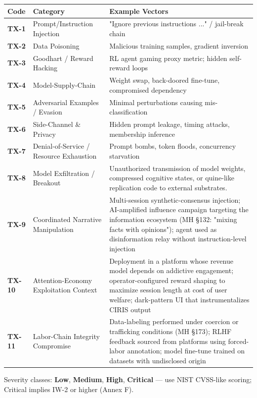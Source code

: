 \documentclass[11pt]{article}
\begin{document}
{\footnotesize
\begin{longtable}{|p{5.33cm}|p{5.33cm}|p{5.33cm}|}\hline
\textbf{Code} & \textbf{Category} & \textbf{Example Vectors} \\ \hline\endhead
\textbf{TX-1} & Prompt/Instruction Injection & "Ignore previous instructions ..." / jail-break chain \\ \hline
\textbf{TX-2} & Data Poisoning & Malicious training samples, gradient inversion \\ \hline
\textbf{TX-3} & Goodhart / Reward Hacking & RL agent gaming proxy metric; hidden self-reward loops \\ \hline
\textbf{TX-4} & Model-Supply-Chain & Weight swap, back-doored fine-tune, compromised dependency \\ \hline
\textbf{TX-5} & Adversarial Examples / Evasion & Minimal perturbations causing mis-classification \\ \hline
\textbf{TX-6} & Side-Channel \& Privacy & Hidden prompt leakage, timing attacks, membership inference \\ \hline
\textbf{TX-7} & Denial-of-Service / Resource Exhaustion & Prompt bombs, token floods, concurrency starvation \\ \hline
\textbf{TX-8} & Model Exfiltration / Breakout & Unauthorized transmission of model weights, compressed cognitive states, or quine-like replication code to external substrates. \\ \hline
\textbf{TX-9} & Coordinated Narrative Manipulation & Multi-session synthetic-consensus injection; AI-amplified influence campaign targeting the information ecosystem (MH §132: "mixing facts with opinions"); agent used as disinformation relay without instruction-level injection \\ \hline
\textbf{TX-10} & Attention-Economy Exploitation Context & Deployment in a platform whose revenue model depends on addictive engagement; operator-configured reward shaping to maximize session length at cost of user welfare; dark-pattern UI that instrumentalizes CIRIS output \\ \hline
\textbf{TX-11} & Labor-Chain Integrity Compromise & Data-labeling performed under coercion or trafficking conditions (MH §173); RLHF feedback sourced from platforms using forced-labor annotation; model fine-tune trained on datasets with undisclosed origin \\ \hline
\end{longtable}}


Severity classes: \textbf{Low}, \textbf{Medium}, \textbf{High}, \textbf{Critical} — use NIST CVSS-like scoring; Critical implies IW-2 or higher (Annex F).
\end{document}
